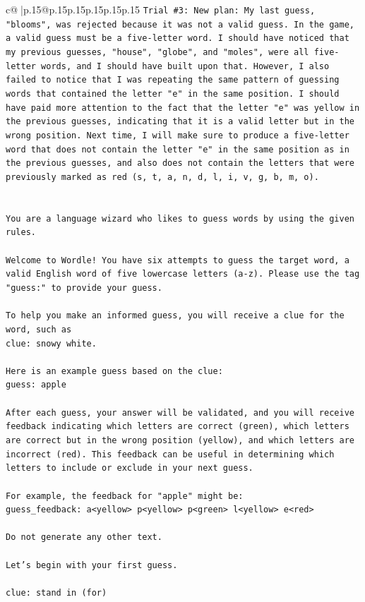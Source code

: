 \documentclass{article}
\begin{document}
{\begin{supertabular}{c@{$\;$}|p{.15\linewidth}@{}p{.15\linewidth}p{.15\linewidth}p{.15\linewidth}p{.15\linewidth}p{.15\linewidth}}
{{{\texttt{Trial \#3: New plan: My last guess, "blooms", was rejected because it was not a valid guess. In the game, a valid guess must be a five{-}letter word. I should have noticed that my previous guesses, "house", "globe", and "moles", were all five{-}letter words, and I should have built upon that. However, I also failed to notice that I was repeating the same pattern of guessing words that contained the letter "e" in the same position. I should have paid more attention to the fact that the letter "e" was yellow in the previous guesses, indicating that it is a valid letter but in the wrong position. Next time, I will make sure to produce a five{-}letter word that does not contain the letter "e" in the same position as in the previous guesses, and also does not contain the letters that were previously marked as red (s, t, a, n, d, l, i, v, g, b, m, o).} \\
\\ 
\\ 
\texttt{You are a language wizard who likes to guess words by using the given rules.} \\
\\ 
\texttt{Welcome to Wordle! You have six attempts to guess the target word, a valid English word of five lowercase letters (a{-}z). Please use the tag "guess:" to provide your guess.} \\
\\ 
\texttt{To help you make an informed guess, you will receive a clue for the word, such as} \\
\texttt{clue: snowy white.} \\
\\ 
\texttt{Here is an example guess based on the clue: } \\
\texttt{guess: apple} \\
\\ 
\texttt{After each guess, your answer will be validated, and you will receive feedback indicating which letters are correct (green), which letters are correct but in the wrong position (yellow), and which letters are incorrect (red). This feedback can be useful in determining which letters to include or exclude in your next guess.} \\
\\ 
\texttt{For example, the feedback for "apple" might be:} \\
\texttt{guess\_feedback: a<yellow> p<yellow> p<green> l<yellow> e<red>} \\
\\ 
\texttt{Do not generate any other text.} \\
\\ 
\texttt{Let's begin with your first guess.} \\
\\ 
\texttt{clue: stand in (for)} \\
            }
        }
    }
     \\ \\


\end{supertabular}}
\end{document}
